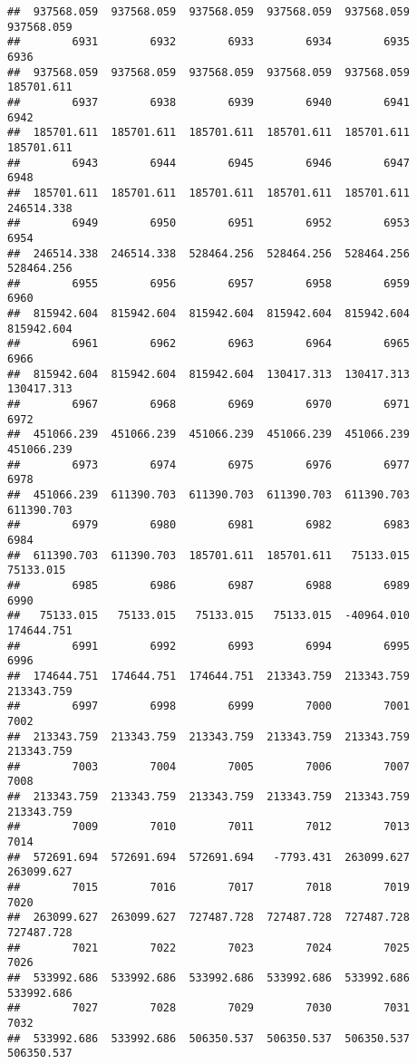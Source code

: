 \documentclass[
]{book}
\begin{document}
\begin{verbatim}
##  937568.059  937568.059  937568.059  937568.059  937568.059  937568.059 
##        6931        6932        6933        6934        6935        6936 
##  937568.059  937568.059  937568.059  937568.059  937568.059  185701.611 
##        6937        6938        6939        6940        6941        6942 
##  185701.611  185701.611  185701.611  185701.611  185701.611  185701.611 
##        6943        6944        6945        6946        6947        6948 
##  185701.611  185701.611  185701.611  185701.611  185701.611  246514.338 
##        6949        6950        6951        6952        6953        6954 
##  246514.338  246514.338  528464.256  528464.256  528464.256  528464.256 
##        6955        6956        6957        6958        6959        6960 
##  815942.604  815942.604  815942.604  815942.604  815942.604  815942.604 
##        6961        6962        6963        6964        6965        6966 
##  815942.604  815942.604  815942.604  130417.313  130417.313  130417.313 
##        6967        6968        6969        6970        6971        6972 
##  451066.239  451066.239  451066.239  451066.239  451066.239  451066.239 
##        6973        6974        6975        6976        6977        6978 
##  451066.239  611390.703  611390.703  611390.703  611390.703  611390.703 
##        6979        6980        6981        6982        6983        6984 
##  611390.703  611390.703  185701.611  185701.611   75133.015   75133.015 
##        6985        6986        6987        6988        6989        6990 
##   75133.015   75133.015   75133.015   75133.015  -40964.010  174644.751 
##        6991        6992        6993        6994        6995        6996 
##  174644.751  174644.751  174644.751  213343.759  213343.759  213343.759 
##        6997        6998        6999        7000        7001        7002 
##  213343.759  213343.759  213343.759  213343.759  213343.759  213343.759 
##        7003        7004        7005        7006        7007        7008 
##  213343.759  213343.759  213343.759  213343.759  213343.759  213343.759 
##        7009        7010        7011        7012        7013        7014 
##  572691.694  572691.694  572691.694   -7793.431  263099.627  263099.627 
##        7015        7016        7017        7018        7019        7020 
##  263099.627  263099.627  727487.728  727487.728  727487.728  727487.728 
##        7021        7022        7023        7024        7025        7026 
##  533992.686  533992.686  533992.686  533992.686  533992.686  533992.686 
##        7027        7028        7029        7030        7031        7032 
##  533992.686  533992.686  506350.537  506350.537  506350.537  506350.537 

\end{verbatim}
\end{document}
